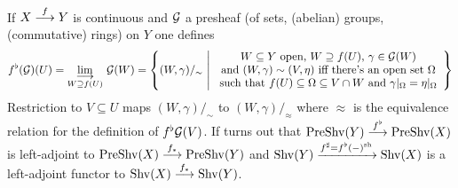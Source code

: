 \documentclass[a4paper,parskip=half,numbers=enddot, DIV=12]{scrreprt}
\begin{document}
    \begin{rem*}
        If $X\morphism[f] Y$ is continuous and $\mathcal{G}$ a presheaf (of sets, (abelian) groups, (commutative) rings) on $Y$ one defines
        \begin{align*}
            f^\flat(\Gg)(U) = \colimit[W\supseteq f(U)] \Gg(W)=\left\{(W,\gamma)/_\sim\st
            \begin{array}{c}
	            W\subseteq Y\text{ open, }W\supseteq f(U)\text{, }\gamma\in \Gg(W)\\
	            \text{and }(W,\gamma)\sim (V,\eta)\text{ iff there's an open set }\Omega\\
	            \text{such that }f(U)\subseteq \Omega\subseteq V\cap W\text{ and }\gamma|_\Omega=\eta|_\Omega
            \end{array}\right\}
        \end{align*}
        Restriction to $V\subseteq U$ maps $(W,\gamma)/_\sim$ to $(W,\gamma)/_\approx$ where $\approx$ is the equivalence relation for the definition of $f^\flat \mathcal{G}(V)$. If turns out that $\cat{PreShv}(Y)  \morphism[f^\flat] \cat{PreShv}(X)$ is left-adjoint to $\cat{PreShv}(X) \morphism[f_*] \cat{PreShv}(Y)$ and $\operatorname{Shv}(Y)  \xrightarrow{f^\sharp = f^\flat(-)^{\mathrm{sh}}} \operatorname{Shv}(X)$ is a left-adjoint functor to $\cat{Shv}(X) \morphism[f_*] \cat{Shv}(Y)$.
    \end{rem*}
\end{document}
